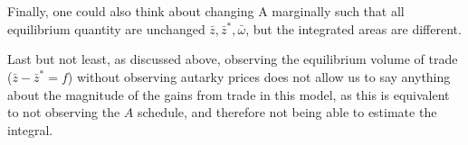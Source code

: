 \documentclass[10pt, final]{article}
\begin{document}
\\
\\
Finally, one could also think about changing A marginally such that all equilibrium quantity are unchanged $\bar{z}, \bar{z}^*, \bar{\omega}$, but the integrated areas are different. 


\bigskip

\noindent Last but not least, as discussed above, observing the equilibrium volume of trade ($\bar{z} - \bar{z}^* = f$) without observing autarky prices does not allow us to say anything about the magnitude of the gains from trade in this model, as this is equivalent to not observing the $A$ schedule, and therefore not being able to estimate the integral.

\end{document}
